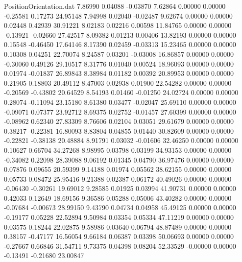 \begin{filecontents}{PositionOrientation.dat}
   7.86990    0.04088   -0.03870     7.62864    0.00000    0.00000   -0.25581    0.17273   24.95148
   7.94998    0.02040   -0.02487     9.62674    0.00000    0.00000    0.02448    0.42939   30.91221
   8.02183    0.02216    0.00598    11.84765    0.00000    0.00000   -0.13921   -0.02660   27.42517
   8.09382    0.01213    0.00406    13.82193    0.00000    0.00000    0.15548   -0.46450   17.64146
   8.17390    0.02459   -0.03313    15.23465    0.00000    0.00000    0.10308    0.04251   22.70074
   8.24587    0.03201   -0.03008    16.86857    0.00000    0.00000   -0.30060    0.49126   29.10517
   8.31776    0.01040    0.00524    18.96093    0.00000    0.00000    0.01974   -0.01837   26.89843
   8.38984    0.01182    0.00392    20.89953    0.00000    0.00000    0.21905    0.18803   20.49112
   8.47003    0.02938    0.01900    22.54282    0.00000    0.00000   -0.20569   -0.43802   20.64529
   8.54193    0.01460   -0.01250    24.02724    0.00000    0.00000    0.28074   -0.11094   23.15180
   8.61380    0.03477   -0.02047    25.69110    0.00000    0.00000   -0.09071    0.07377   23.92712
   8.69375    0.02752   -0.01457    27.60399    0.00000    0.00000   -0.08962    0.62340   27.83309
   8.76606    0.02104    0.03051    29.61679    0.00000    0.00000    0.38217   -0.22381   16.80093
   8.83804    0.04855    0.01440    30.82609    0.00000    0.00000   -0.22821   -0.38138   20.48884
   8.91791    0.03032   -0.01606    32.46250    0.00000    0.00000    0.10627    0.66704   34.27268
   8.98995    0.03798    0.03199    34.93153    0.00000    0.00000   -0.34082    0.22098   28.39088
   9.06192    0.01345    0.04790    36.97476    0.00000    0.00000    0.07876    0.09655   20.59399
   9.14188    0.01974    0.05562    38.62155    0.00000    0.00000    0.05733    0.08472   25.95416
   9.21388    0.02387    0.06172    40.49026    0.00000    0.00000   -0.06430   -0.30261   19.69012
   9.28585    0.01925    0.03994    41.90731    0.00000    0.00000    0.42033    0.12649   18.69156
   9.36586    0.05288    0.05006    43.40282    0.00000    0.00000   -0.07684   -0.00673   28.99150
   9.43790    0.04734    0.04958    45.49125    0.00000    0.00000   -0.19177    0.05228   22.52894
   9.50984    0.03354    0.05334    47.11219    0.00000    0.00000    0.03575    0.18244   22.02875
   9.58986    0.03640    0.06794    48.87489    0.00000    0.00000    0.38157   -0.47177   16.56054
   9.66184    0.06387    0.03398    50.06693    0.00000    0.00000   -0.27667    0.66846   31.54711
   9.73375    0.04398    0.08204    52.33529   -0.00000    0.00000   -0.13491   -0.21680   23.00847

\end{filecontents}
